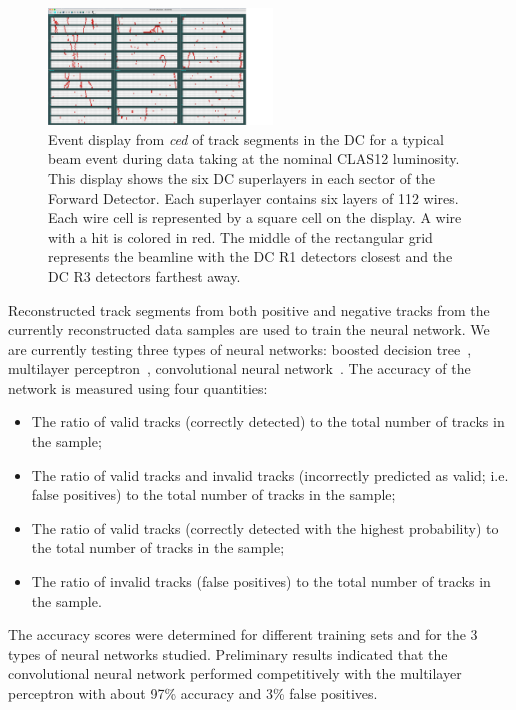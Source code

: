\begin{figure}
\centering
\includegraphics[width=0.53\textwidth]{pics/nn1.png}
\caption{Event display from {\it ced} of track segments in the DC for a typical beam event during data taking
  at the nominal CLAS12 luminosity. This display shows the six DC superlayers in each sector of the Forward
  Detector. Each superlayer contains six layers of 112 wires. Each wire cell is represented by a square cell on the
  display. A wire with a hit is colored in red. The middle of the rectangular grid represents the beamline with the
  DC R1 detectors closest and the DC R3 detectors farthest away.}
\label{fig:nn1}
\end{figure}

Reconstructed track segments from both positive and negative tracks from the currently reconstructed data
samples are used to train the neural network. We are currently testing three types of neural networks: boosted
decision tree~\cite{bdt}, multilayer perceptron~\cite{mp}, convolutional neural network~\cite{cnn}. The accuracy
of the network is measured using four quantities:

\begin{itemize}
\item The ratio of valid tracks (correctly detected) to the total number of tracks in the sample;
\item The ratio of valid tracks and invalid tracks (incorrectly predicted as valid; i.e. false positives) to the
  total number of tracks in the sample;
\item The ratio of valid tracks (correctly detected with the highest probability) to the total number of tracks in
  the sample;
\item The ratio of invalid tracks (false positives) to the total number of tracks in the sample.
\end{itemize}

The accuracy scores were determined for different training sets and for the 3 types of neural networks studied.
Preliminary results indicated that the convolutional neural network performed competitively with the multilayer
perceptron with about 97\% accuracy and 3\% false positives. 

